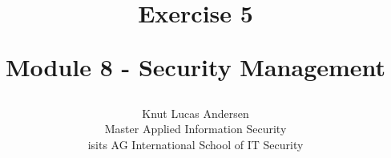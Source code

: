 \title{ 
	\begin{center} \textbf{ Exercise 5 } \end{center}
	\begin{center} {\large Module 8 - Security Management } \end{center}
}

\author{ 
	Knut Lucas Andersen \\
	Master Applied Information Security \\
	isits AG International School of IT Security
}